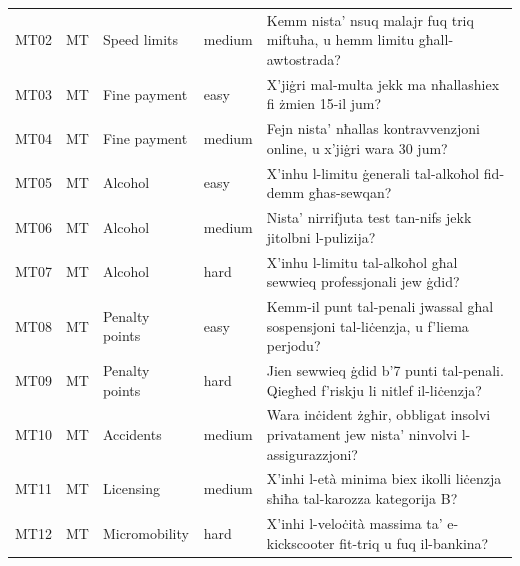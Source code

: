 \begin{table}[tbp]
{\begin{tabularx}{\textwidth}{@{}l l l l >{\raggedright\arraybackslash}X@{}}
MT02 & MT & Speed limits & medium & Kemm nista' nsuq malajr fuq triq miftuħa, u hemm limitu għall-awtostrada? \\
MT03 & MT & Fine payment & easy & X'jiġri mal-multa jekk ma nħallashiex fi żmien 15-il jum? \\
MT04 & MT & Fine payment & medium & Fejn nista' nħallas kontravvenzjoni online, u x'jiġri wara 30 jum? \\
MT05 & MT & Alcohol & easy & X'inhu l-limitu ġenerali tal-alkoħol fid-demm għas-sewqan? \\
MT06 & MT & Alcohol & medium & Nista' nirrifjuta test tan-nifs jekk jitolbni l-pulizija? \\
MT07 & MT & Alcohol & hard & X'inhu l-limitu tal-alkoħol għal sewwieq professjonali jew ġdid? \\
MT08 & MT & Penalty points & easy & Kemm-il punt tal-penali jwassal għal sospensjoni tal-liċenzja, u f'liema perjodu? \\
MT09 & MT & Penalty points & hard & Jien sewwieq ġdid b'7 punti tal-penali. Qiegħed f'riskju li nitlef il-liċenzja? \\
MT10 & MT & Accidents & medium & Wara inċident żgħir, obbligat insolvi privatament jew nista' ninvolvi l-assigurazzjoni? \\
MT11 & MT & Licensing & medium & X'inhi l-età minima biex ikolli liċenzja sħiħa tal-karozza kategorija B? \\
MT12 & MT & Micromobility & hard & X'inhi l-veloċità massima ta' e-kickscooter fit-triq u fuq il-bankina? \\
\bottomrule
\end{tabularx}}
\end{table}
